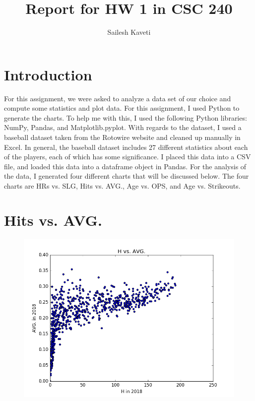 \documentclass{acmart}
\title{Report for HW 1 in CSC 240}
\author{Sailesh Kaveti}
\begin{document}
\maketitle

\section*{Introduction}

For this assignment, we were asked to analyze a data set of our choice and compute some statistics and plot data. For this assignment, I used Python to generate the charts. To help me with this, I used the following Python libraries: NumPy, Pandas, and Matplotlib.pyplot. With regards to the dataset, I used a baseball dataset taken from the Rotowire website and cleaned up manually in Excel. In general, the baseball dataset includes 27 different statistics about each of the players, each of which has some significance. I placed this data into a CSV file, and loaded this data into a dataframe object in Pandas. For the analysis of the data, I generated four different charts that will be discussed below. The four charts are HRs vs. SLG, Hits vs. AVG., Age vs. OPS, and Age vs. Strikeouts.

\section*{Hits vs. AVG.}

\begin{figure}[H]
\includegraphics[scale=.5]{HvsAVG.png}
\end{figure}
\end{document}
